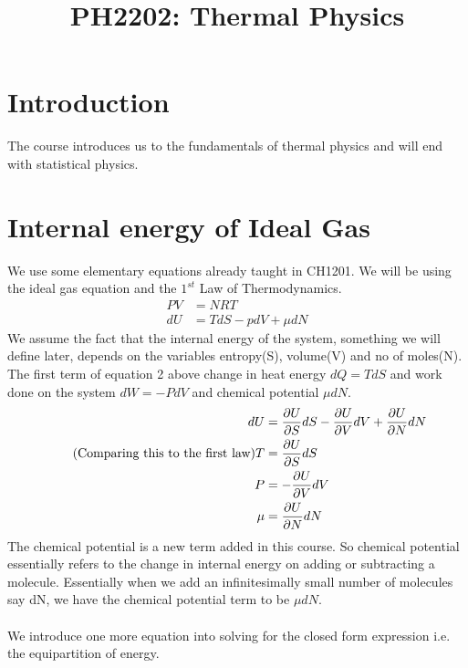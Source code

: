 \documentclass[a4paper]{article}
\title{PH2202: Thermal Physics}
\begin{document}
\maketitle
    \newpage
    \tableofcontents
    \newpage 
    \section{Introduction}
    The course introduces us to the fundamentals of thermal physics and will end with statistical
    physics. 
    
    \section{Internal energy of Ideal Gas}
    We use some elementary equations already taught in CH1201. We will be using the ideal gas 
    equation and the $1^{st}$ Law of Thermodynamics. 
    \begin{align*}
        PV &= NRT \\ 
        dU &= TdS - pdV + \mu dN
    \end{align*}
    We assume the fact that the internal energy of the system, something we will define later,
    depends on the variables entropy(S), volume(V) and no of moles(N). The first term of equation
    2 above change in heat energy $dQ = TdS$ and work done on the system $dW = -PdV$ and 
    chemical potential $\mu dN$. 
    \begin{align*}
        dU &= \pdv{U}{S}dS - \pdv{U}{V}dV + \pdv{U}{N}dN \\ 
        \tag{Comparing this to the first law} 
        T &= \pdv{U}{S}dS\\ 
        P &= - \pdv{U}{V}dV \\ 
        \mu &= \pdv{U}{N}dN 
    \end{align*}
    The chemical potential is a new term added in this course. %
    So chemical potential essentially refers to the change in internal energy on adding or 
    subtracting a molecule. Essentially when we add an infinitesimally small number of molecules
    say dN, we have the chemical potential term to be $\mu dN$.\\[5]
    \\[5]
    We introduce one more equation into solving for the closed form expression i.e. the 
    equipartition of energy.
\end{document}
